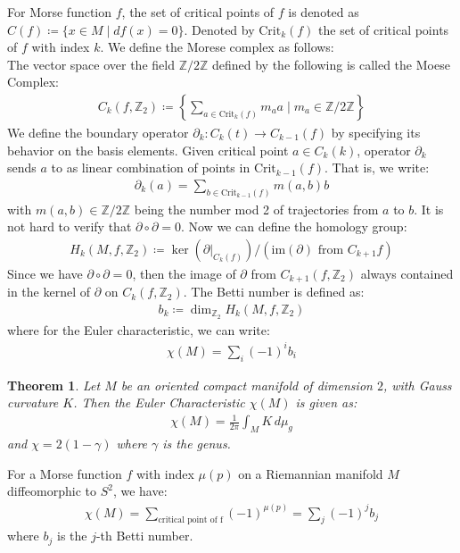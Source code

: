 \documentclass[11pt]{book}
\theoremstyle{break}
\theoremstyle{break}
\newtheorem{thm}{Theorem}[section]
\newcommand{\Z}{\mathbb{Z}}
\newcommand{\pd}{\partial}
\begin{document}
For Morse function $f$, the set of critical points of $f$ is denoted as $C(f) \coloneqq \{x \in M \mid df(x) = 0\}$. Denoted by $\text{Crit}_k(f)$ the set of critical points of $f$ with index $k$. We define the Morese complex as follows:\\

The vector space over the field $\Z/2\Z$ defined by the following is called the Moese Complex:
\begin{align*}
C_k(f, \Z_2) \coloneqq \left\{\sum_{a \in \text{Crit}_k(f)}m_a a \mid m_a \in \Z/2\Z\right\}
\end{align*}
We define the boundary operator $\pd_k:C_k(t) \to C_{k-1}(f)$ by specifying its behavior on the basis elements. Given critical point $a \in C_k(k)$, operator $\pd_k$ sends $a$ to as linear combination  of points in $\text{Crit}_{k-1}(f)$. That is, we write:
\begin{align*}
\pd_k(a) = \sum_{b \in \text{Crit}_{k-1}(f)}m(a,b) b
\end{align*}
with $m(a,b) \in \Z/2\Z$ being the number mod 2 of trajectories from $a$ to $b$. It is not hard to verify that $\pd \circ \pd  = 0$. Now we can define the homology group:
\begin{align*}
H_k(M,f,\Z_2) \coloneqq \ker(\pd|_{C_k(f)})/(\text{im}(\pd)\text{ from }C_{k+1}f)
\end{align*}
Since we have $\pd \circ \pd  = 0$, then the image of $\pd $ from $C_{k+1}(f,\Z_2)$ always contained in the kernel of $\pd$ on $C_k(f,\Z_2)$. The Betti number is defined as:
\begin{align*}
b_k\coloneqq \dim_{\Z_2}H_k(M,f,\Z_2)
\end{align*}
where for the Euler characteristic, we can write:
\begin{align*}
\chi(M) = \sum_i (-1)^i b_i
\end{align*}


\newpage
\begin{thm}
Let $M$ be an oriented compact manifold of dimension $2$, with Gauss curvature $K$. Then the Euler Characteristic $\chi(M)$ is given as:
\begin{align*}
\chi(M) = \frac{1}{2\pi}\int_M K \,d\mu_g
\end{align*}
and $\chi = 2(1-\gamma)$ where $\gamma$ is the genus. 
\end{thm}

For a Morse function $f$ with index $\mu(p)$ on a Riemannian manifold $M$ diffeomorphic to $S^2$, we have:
\begin{align*}
\chi(M) = \sum_{\text{critical point of f}}(-1)^{\mu(p)} = \sum_{j}(-1)^j b_j
\end{align*}
where $b_j$ is the $j$-th Betti number.\\
\end{document}
